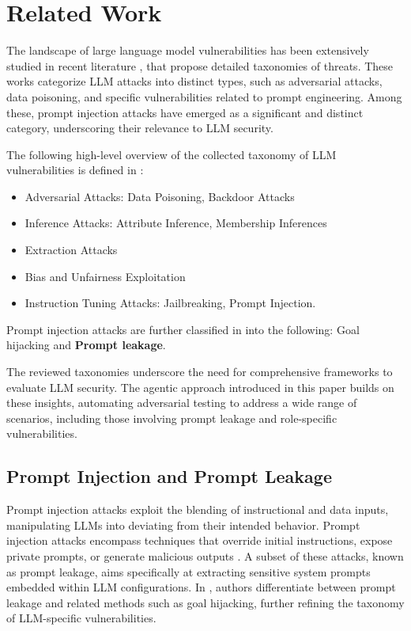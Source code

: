 \section{Related Work}
The landscape of large language model vulnerabilities has been extensively studied in recent literature \cite{crothers2023machinegeneratedtextcomprehensive,shayegani2023surveyvulnerabilitieslargelanguage,Yao_2024,Huang2023ASO}, that propose detailed taxonomies of threats. These works categorize LLM attacks into distinct types, such as adversarial attacks, data poisoning, and specific vulnerabilities related to prompt engineering. Among these, prompt injection attacks have emerged as a significant and distinct category, underscoring their relevance to LLM security.

The following high-level overview of the collected taxonomy of LLM vulnerabilities is defined in \cite{Yao_2024}:
\begin{itemize}
    \item Adversarial Attacks: Data Poisoning, Backdoor Attacks
    \item Inference Attacks: Attribute Inference, Membership Inferences
    \item Extraction Attacks
    \item Bias and Unfairness
Exploitation
    \item Instruction Tuning Attacks: Jailbreaking, Prompt Injection.
\end{itemize}
Prompt injection attacks are further classified in \cite{shayegani2023surveyvulnerabilitieslargelanguage} into the following: Goal hijacking and \textbf{Prompt leakage}.

The reviewed taxonomies underscore the need for comprehensive frameworks to evaluate LLM security. The agentic approach introduced in this paper builds on these insights, automating adversarial testing to address a wide range of scenarios, including those involving prompt leakage and role-specific vulnerabilities.

\subsection{Prompt Injection and Prompt Leakage}

Prompt injection attacks exploit the blending of instructional and data inputs, manipulating LLMs into deviating from their intended behavior. Prompt injection attacks encompass techniques that override initial instructions, expose private prompts, or generate malicious outputs \cite{Huang2023ASO}. A subset of these attacks, known as prompt leakage, aims specifically at extracting sensitive system prompts embedded within LLM configurations. In \cite{shayegani2023surveyvulnerabilitieslargelanguage}, authors differentiate between prompt leakage and related methods such as goal hijacking, further refining the taxonomy of LLM-specific vulnerabilities.

